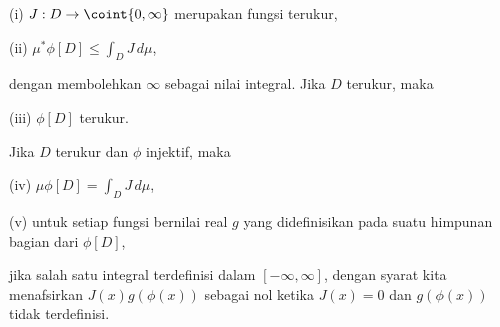 \quad (i) $J:D\to\coint{0,\infty}$ merupakan fungsi terukur,

\quad (ii) $\mu^*\phi[D]\le\int_DJ\,d\mu$,

\noindent dengan membolehkan $\infty$ sebagai nilai integral.  Jika $D$
terukur, maka

\quad (iii) $\phi[D]$ terukur.

\noindent Jika $D$ terukur dan $\phi$ injektif, maka

\quad (iv) $\mu\phi[D]=\int_DJ\,d\mu$,

\quad (v) untuk setiap fungsi bernilai real $g$ yang didefinisikan pada suatu
himpunan bagian dari $\phi[D]$,


\noindent jika salah satu integral terdefinisi dalam $[-\infty,\infty]$, dengan syarat
kita menafsirkan $J(x)g(\phi(x))$ sebagai nol ketika $J(x)=0$ dan
$g(\phi(x))$ tidak terdefinisi.


